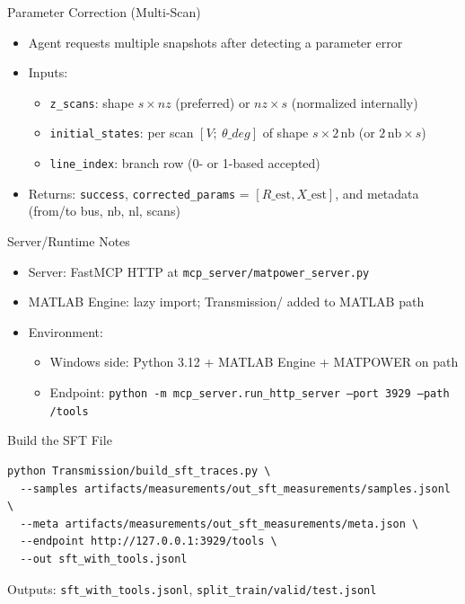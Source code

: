 \documentclass{beamer}
\begin{document}
\begin{frame}{Parameter Correction (Multi-Scan)}
  \begin{itemize}
    \item Agent requests multiple snapshots after detecting a parameter error
    \item Inputs:
      \begin{itemize}
        \item \texttt{z\_scans}: shape $s\!\times\!nz$ (preferred) or $nz\!\times\!s$ (normalized internally)
        \item \texttt{initial\_states}: per scan $[V;\ \theta\_{deg}]$ of shape $s\!\times\!2\,\text{nb}$ (or $2\,\text{nb}\!\times\!s$)
        \item \texttt{line\_index}: branch row (0- or 1-based accepted)
      \end{itemize}
    \item Returns: \texttt{success}, \texttt{corrected\_params} = $[R\_\text{est}, X\_\text{est}]$, and metadata (from/to bus, nb, nl, scans)
  \end{itemize}
\end{frame}

\begin{frame}{Server/Runtime Notes}
  \begin{itemize}
    \item Server: FastMCP HTTP at \texttt{mcp\_server/matpower\_server.py}
    \item MATLAB Engine: lazy import; Transmission/ added to MATLAB path
    \item Environment:
      \begin{itemize}
        \item Windows side: Python 3.12 + MATLAB Engine + MATPOWER on path
        \item Endpoint: \texttt{python -m mcp\_server.run\_http\_server --port 3929 --path /tools}
      \end{itemize}
  \end{itemize}
\end{frame}

\begin{frame}[fragile]{Build the SFT File}
\begin{verbatim}
python Transmission/build_sft_traces.py \
  --samples artifacts/measurements/out_sft_measurements/samples.jsonl \
  --meta artifacts/measurements/out_sft_measurements/meta.json \
  --endpoint http://127.0.0.1:3929/tools \
  --out sft_with_tools.jsonl
\end{verbatim}
  Outputs: \texttt{sft\_with\_tools.jsonl}, \texttt{split\_train/valid/test.jsonl}
\end{frame}
\end{document}

